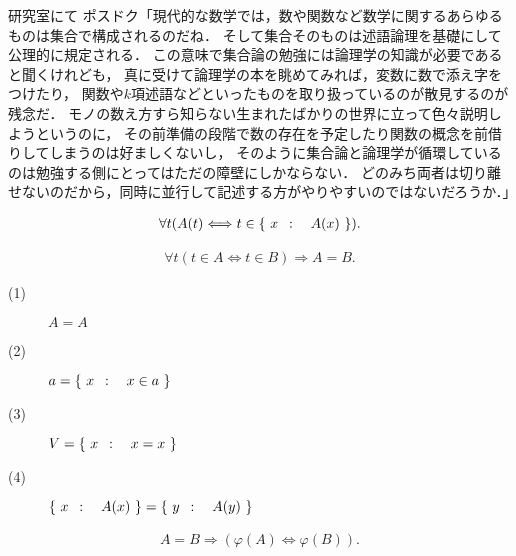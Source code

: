 	\begin{itembox}[l]{研究室にて}
		ポスドク「現代的な数学では，数や関数など数学に関するあらゆるものは集合で構成されるのだね．
		そして集合そのものは述語論理を基礎にして公理的に規定される．
		この意味で集合論の勉強には論理学の知識が必要であると聞くけれども，
		真に受けて論理学の本を眺めてみれば，変数に数で添え字をつけたり，
		関数や$k$項述語などといったものを取り扱っているのが散見するのが残念だ．
		モノの数え方すら知らない生まれたばかりの世界に立って色々説明しようというのに，
		その前準備の段階で数の存在を予定したり関数の概念を前借りしてしまうのは好ましくないし，
		そのように集合論と論理学が循環しているのは勉強する側にとってはただの障壁にしかならない．
		どのみち両者は切り離せないのだから，同時に並行して記述する方がやりやすいのではないだろうか．」
	\end{itembox}
	
	\begin{screen}
		\begin{axm}[類の公理]
			\begin{align}
				\forall t(A(t) \Longleftrightarrow t \in \left\{\ x\ \, : \quad A(x)\ \right\}).
			\end{align}
		\end{axm}
	\end{screen}
	
	\begin{screen}
		\begin{axm}[外延性の公理]
			\begin{align}
				\forall t(t \in A  \Longleftrightarrow t \in B)
				\Longrightarrow A=B.
			\end{align}
		\end{axm}
	\end{screen}
	
	\begin{screen}
		\begin{thm}
			\begin{description}
				\item[(1)] $A=A$
				\item[(2)] $a = \left\{\ x\ \, : \quad x \in a\ \right\}$
				\item[(3)] $V=\left\{\ x\ \, : \quad x=x\ \right\}$
				\item[(4)] $\left\{\ x\ \, : \quad A(x)\ \right\} = \left\{\ y\ \, : \quad A(y)\ \right\}$
			\end{description}
		\end{thm}
	\end{screen}
	
	\begin{screen}
		\begin{axm}[相等性の公理]
			\begin{align}
				A=B \Longrightarrow (\varphi(A) \Longleftrightarrow \varphi(B)).
			\end{align}
		\end{axm}
	\end{screen}
	
